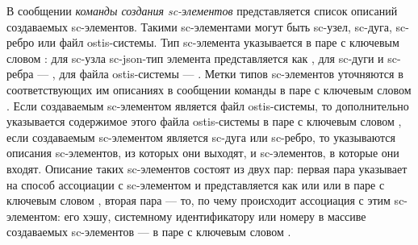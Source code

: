 В сообщении \textit{команды создания sc-элементов} представляется список описаний создаваемых sc-элементов. Такими sc-элементами могут быть sc-узел, sc-дуга, sc-ребро или файл ostis-системы. Тип sc-элемента указывается в паре с ключевым словом : для sc-узла sc-json-тип элемента представляется как , для sc-дуги и sc-ребра --- , для файла ostis-системы --- . Метки типов sc-элементов уточняются в соответствующих им описаниях в сообщении команды в паре с ключевым словом . Если создаваемым sc-элементом является файл ostis-системы, то дополнительно указывается содержимое этого файла ostis-системы в паре с ключевым словом , если создаваемым sc-элементом является sc-дуга или sc-ребро, то указываются описания sc-элементов, из которых они выходят, и sc-элементов, в которые они входят. Описание таких sc-элементов состоят из двух пар: первая пара указывает на способ ассоциации с sc-элементом и представляется как  или  или  в паре с ключевым словом , вторая пара --- то, по чему происходит ассоциация с этим sc-элементом: его хэшу, системному идентификатору или номеру в массиве создаваемых sc-элементов --- в паре с ключевым словом  .

